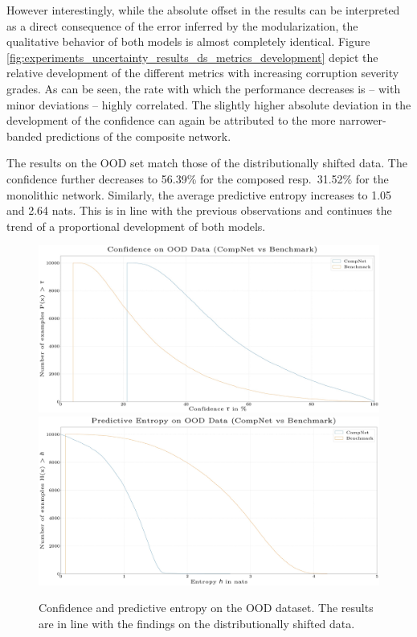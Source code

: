However interestingly, while the absolute offset in the results can be interpreted as a direct consequence of the error inferred by the modularization, the qualitative behavior of both models is almost completely identical. Figure \ref{fig:experiments_uncertainty_results_ds_metrics_development} depict the relative development of the different metrics with increasing corruption severity grades. As can be seen, the rate with which the performance decreases is -- with minor deviations -- highly correlated. The slightly higher absolute deviation in the development of the confidence can again be attributed to the more narrower-banded predictions of the composite network.

The results on the OOD set match those of the distributionally shifted data. The confidence further decreases to 56.39\% for the composed resp.\ 31.52\% for the monolithic network. Similarly, the average predictive entropy increases to 1.05 and 2.64 nats. This is in line with the previous observations and continues the trend of a proportional development of both models.

\begin{figure}[tb]
    \centering
	    \includegraphics[width=\textwidth, trim=0 0 0 -25, clip]{thesis/graphics/diagrams/uncertainty/uncertainty_compnet_benchmark_ood_confidence_print.jpg}
	    \includegraphics[width=\textwidth, trim=0 -25 0 0, clip]{thesis/graphics/diagrams/uncertainty/uncertainty_compnet_benchmark_ood_pred_entropy_print.jpg}
    \caption{Confidence and predictive entropy on the OOD dataset. The results are in line with the findings on the distributionally shifted data.}
    \label{fig:experiments_uncertainty_results_ood_confidence_pred_entropy}
\end{figure}

